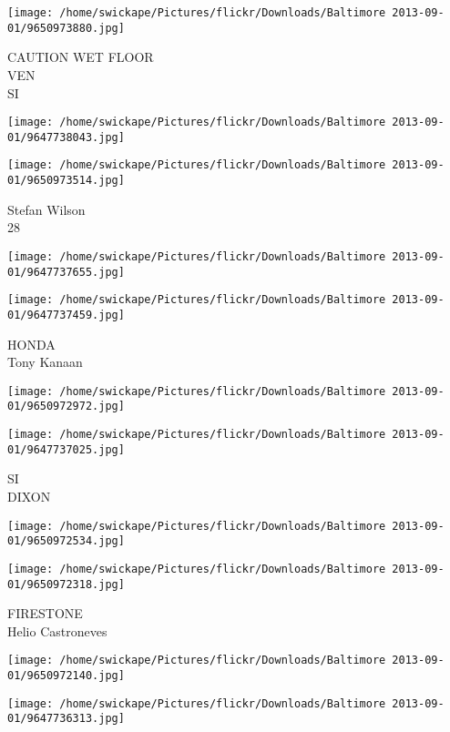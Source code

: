 \documentclass[10pt,letterpaper]{article}
\begin{document}
\vspace{0.25in}
\texttt{[image: /home/swickape/Pictures/flickr/Downloads/Baltimore 2013-09-01/9650973880.jpg]}

CAUTION WET FLOOR\\
VEN\\
SI
\pagebreak

\texttt{[image: /home/swickape/Pictures/flickr/Downloads/Baltimore 2013-09-01/9647738043.jpg]}

\vspace{0.25in}
\texttt{[image: /home/swickape/Pictures/flickr/Downloads/Baltimore 2013-09-01/9650973514.jpg]}

Stefan Wilson\\
28
\pagebreak

\texttt{[image: /home/swickape/Pictures/flickr/Downloads/Baltimore 2013-09-01/9647737655.jpg]}

\vspace{0.25in}
\texttt{[image: /home/swickape/Pictures/flickr/Downloads/Baltimore 2013-09-01/9647737459.jpg]}

HONDA\\
Tony Kanaan
\pagebreak

\texttt{[image: /home/swickape/Pictures/flickr/Downloads/Baltimore 2013-09-01/9650972972.jpg]}

\vspace{0.25in}
\texttt{[image: /home/swickape/Pictures/flickr/Downloads/Baltimore 2013-09-01/9647737025.jpg]}

SI\\
DIXON
\pagebreak

\texttt{[image: /home/swickape/Pictures/flickr/Downloads/Baltimore 2013-09-01/9650972534.jpg]}

\vspace{0.25in}
\texttt{[image: /home/swickape/Pictures/flickr/Downloads/Baltimore 2013-09-01/9650972318.jpg]}

FIRESTONE\\
Helio Castroneves
\pagebreak

\texttt{[image: /home/swickape/Pictures/flickr/Downloads/Baltimore 2013-09-01/9650972140.jpg]}

\vspace{0.25in}
\texttt{[image: /home/swickape/Pictures/flickr/Downloads/Baltimore 2013-09-01/9647736313.jpg]}
\end{document}
